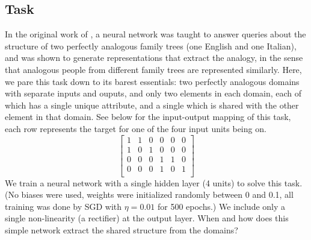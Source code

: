 \documentclass[10pt,letterpaper]{article}
\begin{document}
\subsection{Task}
In the original work of \citet{Hinton1986}, a neural network was taught to answer queries about the structure of two perfectly analogous family trees (one English and one Italian), and was shown to generate representations that extract the analogy, in the sense that analogous people from different family trees are represented similarly. Here, we pare this task down to its barest essentials: two perfectly analogous domains with separate inputs and ouputs, and only two elements in each domain, each of which has a single unique attribute, and a single which is shared with the other element in that domain. See below for the input-output mapping of this task, each row represents the target for one of the four input units being on.
\[
\left[ \begin{matrix} 
1 & 1 & 0 & 0 & 0 & 0 \\
1 & 0 & 1 & 0 & 0 & 0 \\
 0 & 0 & 0 & 1 & 1 & 0\\
 0 & 0 & 0 & 1 & 0 & 1\\
\end{matrix}  \right] 
\]
We train a neural network with a single hidden layer (4 units) to solve this task. (No biases were used, weights were initialized randomly between 0 and 0.1, all training was done by SGD with \(\eta = 0.01\) for 500 epochs.) We include only a single non-linearity (a rectifier) at the output layer. When and how does this simple network extract the shared structure from the domains? \par
\end{document}
